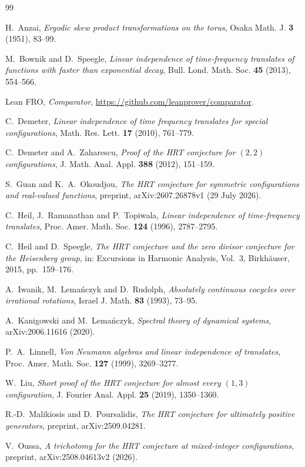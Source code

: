 \documentclass[11pt]{amsart}
\theoremstyle{remark}
\begin{document}
\begin{thebibliography}{99}

 H.~Anzai, \emph{Ergodic skew product transformations on the torus},
Osaka Math. J. \textbf{3} (1951), 83--99.

 M.~Bownik and D.~Speegle, \emph{Linear independence of time-frequency translates
of functions with faster than exponential decay}, Bull. Lond. Math. Soc. \textbf{45} (2013),
554--566.

 Lean FRO, \emph{Comparator}, \url{https://github.com/leanprover/comparator}.

 C.~Demeter, \emph{Linear independence of time frequency translates for special
configurations}, Math. Res. Lett. \textbf{17} (2010), 761--779.

 C.~Demeter and A.~Zaharescu, \emph{Proof of the HRT conjecture for $(2,2)$
configurations}, J. Math. Anal. Appl. \textbf{388} (2012), 151--159.

 S.~Guan and K.~A.~Okoudjou, \emph{The HRT conjecture for symmetric
configurations and real-valued functions}, preprint, arXiv:2607.26878v1 (29 July 2026).

 C.~Heil, J.~Ramanathan and P.~Topiwala, \emph{Linear independence of
time-frequency translates}, Proc. Amer. Math. Soc. \textbf{124} (1996), 2787--2795.

 C.~Heil and D.~Speegle, \emph{The HRT conjecture and the zero divisor conjecture
for the Heisenberg group}, in: Excursions in Harmonic Analysis, Vol.~3, Birkh\"auser, 2015,
pp.~159--176.

 A.~Iwanik, M.~Lema\'nczyk and D.~Rudolph, \emph{Absolutely continuous cocycles
over irrational rotations}, Israel J. Math. \textbf{83} (1993), 73--95.

 A.~Kanigowski and M.~Lema\'nczyk, \emph{Spectral theory of dynamical systems},
arXiv:2006.11616 (2020).

 P.~A.~Linnell, \emph{Von Neumann algebras and linear independence of
translates}, Proc. Amer. Math. Soc. \textbf{127} (1999), 3269--3277.

 W.~Liu, \emph{Short proof of the HRT conjecture for almost every $(1,3)$
configuration}, J. Fourier Anal. Appl. \textbf{25} (2019), 1350--1360.

 R.-D.~Malikiosis and D.~Poursalidis, \emph{The HRT conjecture for ultimately
positive generators}, preprint, arXiv:2509.04281.

 V.~Oussa, \emph{A trichotomy for the HRT conjecture at mixed-integer
configurations}, preprint, arXiv:2508.04613v2 (2026).

\end{thebibliography}
\end{document}
